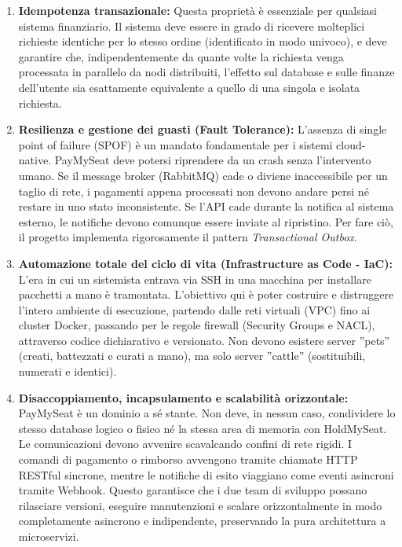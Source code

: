 \documentclass[11pt,a4paper]{report}
\begin{document}
\begin{enumerate}
    \item \textbf{Idempotenza transazionale:} Questa propriet\`a \`e essenziale per qualsiasi sistema finanziario. Il sistema deve essere in grado di ricevere molteplici richieste identiche per lo stesso ordine (identificato in modo univoco), e deve garantire che, indipendentemente da quante volte la richiesta venga processata in parallelo da nodi distribuiti, l'effetto sul database e sulle finanze dell'utente sia esattamente equivalente a quello di una singola e isolata richiesta.
    \item \textbf{Resilienza e gestione dei guasti (Fault Tolerance):} L'assenza di single point of failure (SPOF) \`e un mandato fondamentale per i sistemi cloud-native. PayMySeat deve potersi riprendere da un crash senza l'intervento umano. Se il message broker (RabbitMQ) cade o diviene inaccessibile per un taglio di rete, i pagamenti appena processati non devono andare persi n\'e restare in uno stato inconsistente. Se l'API cade durante la notifica al sistema esterno, le notifiche devono comunque essere inviate al ripristino. Per fare ci\`o, il progetto implementa rigorosamente il pattern \textit{Transactional Outbox}.
    \item \textbf{Automazione totale del ciclo di vita (Infrastructure as Code - IaC):} L'era in cui un sistemista entrava via SSH in una macchina per installare pacchetti a mano \`e tramontata. L'obiettivo qui \`e poter costruire e distruggere l'intero ambiente di esecuzione, partendo dalle reti virtuali (VPC) fino ai cluster Docker, passando per le regole firewall (Security Groups e NACL), attraverso codice dichiarativo e versionato. Non devono esistere server ''pets'' (creati, battezzati e curati a mano), ma solo server ''cattle'' (sostituibili, numerati e identici).
    \item \textbf{Disaccoppiamento, incapsulamento e scalabilit\`a orizzontale:} PayMySeat \`e un dominio a s\'e stante. Non deve, in nessun caso, condividere lo stesso database logico o fisico n\'e la stessa area di memoria con HoldMySeat. Le comunicazioni devono avvenire scavalcando confini di rete rigidi. I comandi di pagamento o rimborso avvengono tramite chiamate HTTP RESTful sincrone, mentre le notifiche di esito viaggiano come eventi asincroni tramite Webhook. Questo garantisce che i due team di sviluppo possano rilasciare versioni, eseguire manutenzioni e scalare orizzontalmente in modo completamente asincrono e indipendente, preservando la pura architettura a microservizi.
\end{enumerate}
\end{document}
